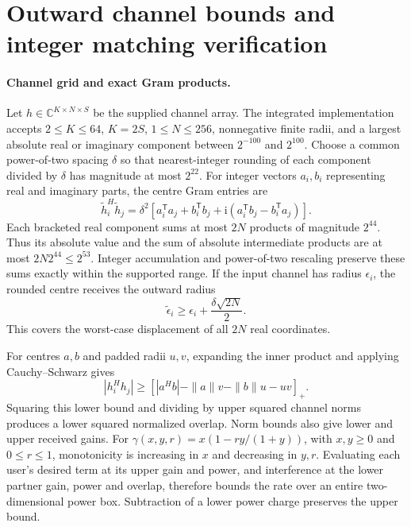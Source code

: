 \section{Outward channel bounds and integer matching verification}
\label{supp:note3}

\paragraph{Channel grid and exact Gram products.}
Let \(h\in\mathbb C^{K\times N\times S}\) be the supplied channel array. The integrated implementation accepts \(2\leq K\leq64\), \(K=2S\), \(1\leq N\leq256\), nonnegative finite radii, and a largest absolute real or imaginary component between \(2^{-100}\) and \(2^{100}\). Choose a common power-of-two spacing \(\delta\) so that nearest-integer rounding of each component divided by \(\delta\) has magnitude at most \(2^{22}\). For integer vectors \(a_i,b_i\) representing real and imaginary parts, the centre Gram entries are
\begin{equation}
 \widetilde h_i^H\widetilde h_j
 =\delta^2\left[
    a_i^\mathsf T a_j+b_i^\mathsf T b_j
    +\mathrm i(a_i^\mathsf T b_j-b_i^\mathsf T a_j)\right].
\end{equation}
Each bracketed real component sums at most \(2N\) products of magnitude \(2^{44}\). Thus its absolute value and the sum of absolute intermediate products are at most
\(2N2^{44}\leq2^{53}\). Integer accumulation and power-of-two rescaling preserve these sums exactly within the supported range. If the input channel has radius \(\epsilon_i\), the rounded centre receives the outward radius
\begin{equation}
 \widetilde\epsilon_i\geq\epsilon_i+\frac{\delta\sqrt{2N}}{2}.
\end{equation}
This covers the worst-case displacement of all \(2N\) real coordinates.

For centres \(a,b\) and padded radii \(u,v\), expanding the inner product and applying Cauchy--Schwarz gives
\begin{equation}
 |h_i^Hh_j|\geq
 \left[|a^Hb|-\|a\|v-\|b\|u-uv\right]_+ .
\end{equation}
Squaring this lower bound and dividing by upper squared channel norms produces a lower squared normalized overlap. Norm bounds also give lower and upper received gains. For
\(\gamma(x,y,r)=x(1-r y/(1+y))\), with \(x,y\geq0\) and \(0\leq r\leq1\), monotonicity is increasing in \(x\) and decreasing in \(y,r\). Evaluating each user's desired term at its upper gain and power, and interference at the lower partner gain, power and overlap, therefore bounds the rate over an entire two-dimensional power box. Subtraction of a lower power charge preserves the upper bound.

